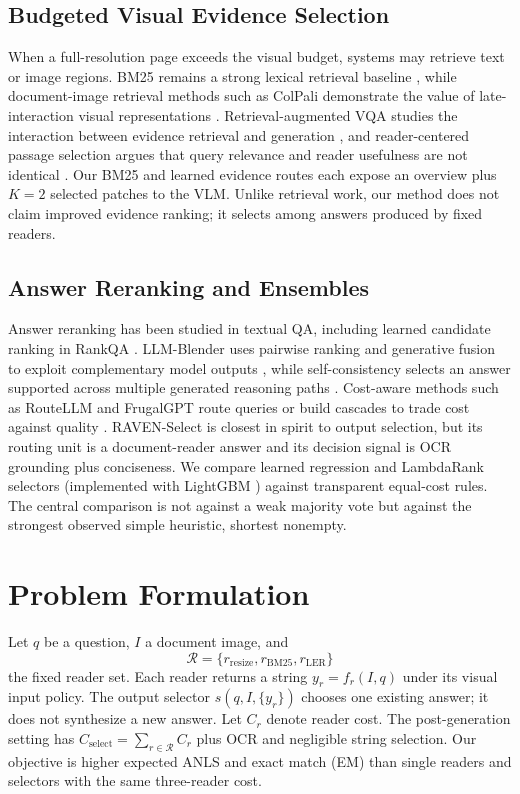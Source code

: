 \documentclass[journal]{IEEEtran}
\begin{document}
\subsection{Budgeted Visual Evidence Selection}
When a full-resolution page exceeds the visual budget, systems may retrieve
text or image regions.  BM25 remains a strong lexical retrieval baseline
\cite{bm25}, while document-image retrieval methods such as ColPali demonstrate
the value of late-interaction visual representations \cite{colpali}.
Retrieval-augmented VQA studies the interaction between evidence retrieval and
generation \cite{ravqa}, and reader-centered passage selection argues that
query relevance and reader usefulness are not identical \cite{readercps}.
Our BM25 and learned evidence routes each expose an overview plus $K=2$
selected patches to the VLM.  Unlike retrieval work, our method does not claim
improved evidence ranking; it selects among answers produced by fixed readers.

\subsection{Answer Reranking and Ensembles}
Answer reranking has been studied in textual QA, including learned candidate
ranking in RankQA \cite{rankqa}.  LLM-Blender uses pairwise ranking and
generative fusion to exploit complementary model outputs \cite{llmblender},
while self-consistency selects an answer supported across multiple generated
reasoning paths \cite{selfconsistency}.  Cost-aware methods such as RouteLLM
and FrugalGPT route queries or build cascades to trade cost against quality
\cite{routellm,frugalgpt}.  RAVEN-Select is closest in spirit to output
selection, but its routing unit is a document-reader answer and its decision
signal is OCR grounding plus conciseness.  We compare learned regression and
LambdaRank selectors (implemented with LightGBM \cite{lightgbm}) against
transparent equal-cost rules.  The central comparison is not against a weak
majority vote but against the strongest observed simple heuristic, shortest
nonempty.

\section{Problem Formulation}
Let $q$ be a question, $I$ a document image, and
\[
\mathcal{R}=\{r_{\mathrm{resize}},r_{\mathrm{BM25}},r_{\mathrm{LER}}\}
\]
the fixed reader set.  Each reader returns a string
$y_r=f_r(I,q)$ under its visual input policy.  The output selector
$s(q,I,\{y_r\})$ chooses one existing answer; it does not synthesize a new
answer.  Let $C_r$ denote reader cost.  The post-generation setting has
$C_{\mathrm{select}}=\sum_{r\in\mathcal{R}}C_r$ plus OCR and negligible string
selection.  Our objective is higher expected ANLS and exact match (EM) than
single readers and selectors with the same three-reader cost.
\end{document}
